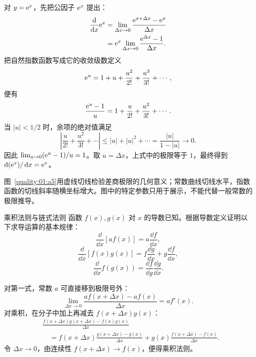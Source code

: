 {\begin{xesolution}
对 $y=\mathrm e^x$，先把公因子 $\mathrm e^x$ 提出：
\begin{align*}
 \frac{\mathop{}\!\mathrm d}{\mathop{}\!\mathrm d x}\mathrm e^x
 &=\lim_{\Delta x\to0}
 \frac{\mathrm e^{x+\Delta x}-\mathrm e^x}{\Delta x}\\
 &=\mathrm e^x\lim_{\Delta x\to0}
 \frac{\mathrm e^{\Delta x}-1}{\Delta x}.
\end{align*}
把自然指数函数写成它的收敛级数定义
\[
 \mathrm e^u=1+u+\frac{u^2}{2!}+\frac{u^3}{3!}+\cdots,
\]
便有
\[
 \frac{\mathrm e^u-1}{u}
 =1+\frac{u}{2!}+\frac{u^2}{3!}+\cdots.
\]
当 $|u|<1/2$ 时，余项的绝对值满足
\[
 \left|\frac{u}{2!}+\frac{u^2}{3!}+\cdots\right|
 \le |u|+|u|^2+\cdots=\frac{|u|}{1-|u|}\longrightarrow0.
\]
因此 $\lim_{u\to0}(\mathrm e^u-1)/u=1$。取 $u=\Delta x$，上式中的极限等于 $1$，最终得到
$\mathop{}\!\mathrm d(\mathrm e^x)/\mathop{}\!\mathrm d x=\mathrm e^x$。


图~\ref{quality:01:a5}用虚线切线检验差商极限的几何意义；常数曲线切线水平，指数函数的切线斜率随横坐标增大。图中的特定参数只用于展示，不能代替一般常数的极限推导。
\end{xesolution}

\begin{origexamplebox}{乘积法则与链式法则}\label{ch01:ex:s14-1-2}
函数 $f(x),g(x)$ 对 $x$ 的导数已知。根据导数定义证明以下求导运算的基本规律：
\[
 \frac{\dd}{\dd x}[a f(x)]=a\frac{\dd f}{\dd x},
\]
\[
 \frac{\dd}{\dd x}[f(x)g(x)]
 =f\frac{\dd g}{\dd x}+g\frac{\dd f}{\dd x},
\]
\[
 \frac{\dd}{\dd x}f(g(x))=\frac{\dd f}{\dd g}\frac{\dd g}{\dd x}.
\]

\end{origexamplebox}

\begin{xesolution}
对第一式，常数 $a$ 可直接移到极限号外：
\[
 \lim_{\Delta x\to0}\frac{af(x+\Delta x)-af(x)}{\Delta x}
 =a f'(x).
\]
对乘积，在分子中加上再减去 $f(x+\Delta x)g(x)$：
\begin{align*}
 &\frac{f(x+\Delta x)g(x+\Delta x)-f(x)g(x)}{\Delta x}\\
 &\quad=f(x+\Delta x)\frac{g(x+\Delta x)-g(x)}{\Delta x}
 +g(x)\frac{f(x+\Delta x)-f(x)}{\Delta x}.
\end{align*}
令 $\Delta x\to0$，由连续性 $f(x+\Delta x)\to f(x)$，便得乘积法则。


\end{xesolution}}
